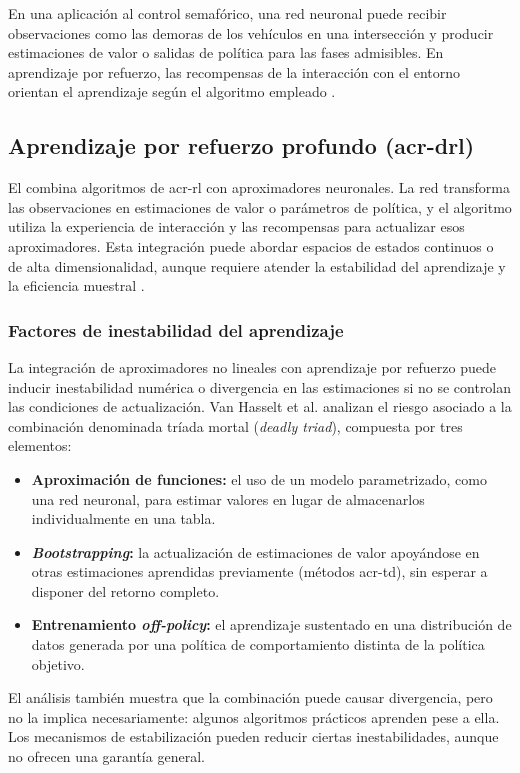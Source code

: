 En una aplicación al control semafórico, una red neuronal puede recibir observaciones como las demoras de los vehículos en una intersección y producir estimaciones de valor o salidas de política para las fases admisibles. En aprendizaje por refuerzo, las recompensas de la interacción con el entorno orientan el aprendizaje según el algoritmo empleado \cite{suttonRL}.
\subsection[Aprendizaje por refuerzo profundo (DRL)]{Aprendizaje por refuerzo profundo (\acrshort{acr-drl})}

El  combina algoritmos de \acrshort{acr-rl} con aproximadores neuronales. La red transforma las observaciones en estimaciones de valor o parámetros de política, y el algoritmo utiliza la experiencia de interacción y las recompensas para actualizar esos aproximadores. Esta integración puede abordar espacios de estados continuos o de alta dimensionalidad, aunque requiere atender la estabilidad del aprendizaje y la eficiencia muestral \cite{marlbook}.

\subsubsection{Factores de inestabilidad del aprendizaje}

La integración de aproximadores no lineales con aprendizaje por refuerzo puede inducir inestabilidad numérica o divergencia en las estimaciones si no se controlan las condiciones de actualización. Van Hasselt et al. \cite{vanhasselt2018deadlytriad} analizan el riesgo asociado a la combinación denominada tríada mortal (\textit{deadly triad}), compuesta por tres elementos:
\begin{itemize}
    \item \textbf{Aproximación de funciones:} el uso de un modelo parametrizado, como una red neuronal, para estimar valores en lugar de almacenarlos individualmente en una tabla.
    \item \textbf{\textit{Bootstrapping}:} la actualización de estimaciones de valor apoyándose en otras estimaciones aprendidas previamente (métodos \acrshort{acr-td}), sin esperar a disponer del retorno completo.
    \item \textbf{Entrenamiento \textit{off-policy}:} el aprendizaje sustentado en una distribución de datos generada por una política de comportamiento distinta de la política objetivo.
\end{itemize}
El análisis también muestra que la combinación puede causar divergencia, pero no la implica necesariamente: algunos algoritmos prácticos aprenden pese a ella. Los mecanismos de estabilización pueden reducir ciertas inestabilidades, aunque no ofrecen una garantía general.

